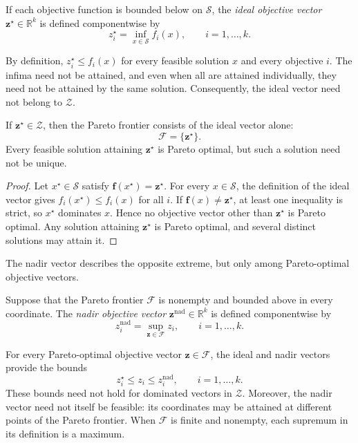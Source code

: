 \begin{definition}
\label{def:ideal_objective_vector}
If each objective function is bounded below on $\mathcal{S}$, the \emph{ideal objective vector} $\mathbf{z}^{\star}\in\mathbb{R}^k$ is defined componentwise by
\[
z_i^{\star}=\inf_{x\in\mathcal{S}} f_i(x),
\qquad i=1,\ldots,k.
\]
\end{definition}

By definition, $z_i^{\star}\leq f_i(x)$ for every feasible solution $x$ and every objective $i$. The infima need not be attained, and even when all are attained individually, they need not be attained by the same solution. Consequently, the ideal vector need not belong to $\mathcal{Z}$.

\begin{proposition}
\label{prop:feasible_ideal_vector}
If $\mathbf{z}^{\star}\in\mathcal{Z}$, then the Pareto frontier consists of the ideal vector alone:
\[
\mathcal{F}=\{\mathbf{z}^{\star}\}.
\]
Every feasible solution attaining $\mathbf{z}^{\star}$ is Pareto optimal, but such a solution need not be unique.
\end{proposition}
\begin{proof}
Let $x^{\star}\in\mathcal{S}$ satisfy $\mathbf{f}(x^{\star})=\mathbf{z}^{\star}$. For every $x\in\mathcal{S}$, the definition of the ideal vector gives $f_i(x^{\star})\leq f_i(x)$ for all $i$. If $\mathbf{f}(x)\neq\mathbf{z}^{\star}$, at least one inequality is strict, so $x^{\star}$ dominates $x$. Hence no objective vector other than $\mathbf{z}^{\star}$ is Pareto optimal. Any solution attaining $\mathbf{z}^{\star}$ is Pareto optimal, and several distinct solutions may attain it.
\end{proof}

The nadir vector describes the opposite extreme, but only among Pareto-optimal objective vectors.

\begin{definition}
\label{def:nadir_objective_vector}
Suppose that the Pareto frontier $\mathcal{F}$ is nonempty and bounded above in every coordinate. The \emph{nadir objective vector} $\mathbf{z}^{\mathrm{nad}}\in\mathbb{R}^k$ is defined componentwise by
\[
z_i^{\mathrm{nad}}=\sup_{\mathbf{z}\in\mathcal{F}}z_i, \qquad i=1,\ldots,k.
\]
\end{definition}

For every Pareto-optimal objective vector $\mathbf{z}\in\mathcal{F}$, the ideal and nadir vectors provide the bounds
\[
z_i^{\star}\leq z_i\leq z_i^{\mathrm{nad}}, \qquad i=1,\ldots,k.
\]
These bounds need not hold for dominated vectors in $\mathcal{Z}$. Moreover, the nadir vector need not itself be feasible: its coordinates may be attained at different points of the Pareto frontier. When $\mathcal{F}$ is finite and nonempty, each supremum in its definition is a maximum.

